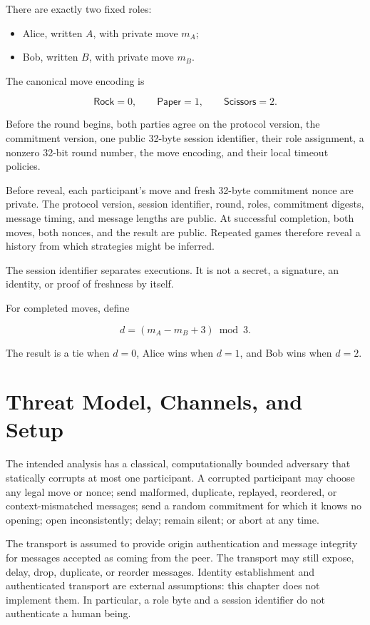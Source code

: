 There are exactly two fixed roles:

\begin{itemize}
    \item Alice, written \(A\), with private move \(m_A\);
    \item Bob, written \(B\), with private move \(m_B\).
\end{itemize}

The canonical move encoding is

\[
    \mathsf{Rock}=0,\qquad
    \mathsf{Paper}=1,\qquad
    \mathsf{Scissors}=2.
\]

Before the round begins, both parties agree on the protocol version, the
commitment version, one public 32-byte session identifier, their role
assignment, a nonzero 32-bit round number, the move encoding, and their local
timeout policies.

Before reveal, each participant's move and fresh 32-byte commitment nonce are
private. The protocol version, session identifier, round, roles, commitment
digests, message timing, and message lengths are public. At successful
completion, both moves, both nonces, and the result are public. Repeated games
therefore reveal a history from which strategies might be inferred.

The session identifier separates executions. It is not a secret, a signature,
an identity, or proof of freshness by itself.

For completed moves, define

\[
    d=(m_A-m_B+3)\bmod 3.
\]

The result is a tie when \(d=0\), Alice wins when \(d=1\), and Bob wins when
\(d=2\).

\section{Threat Model, Channels, and Setup}

The intended analysis has a classical, computationally bounded adversary that
statically corrupts at most one participant. A corrupted participant may
choose any legal move or nonce; send malformed, duplicate, replayed,
reordered, or context-mismatched messages; send a random commitment for which
it knows no opening; open inconsistently; delay; remain silent; or abort at any
time.

The transport is assumed to provide origin authentication and message
integrity for messages accepted as coming from the peer. The transport may
still expose, delay, drop, duplicate, or reorder messages. Identity
establishment and authenticated transport are external assumptions: this
chapter does not implement them. In particular, a role byte and a session
identifier do not authenticate a human being.

